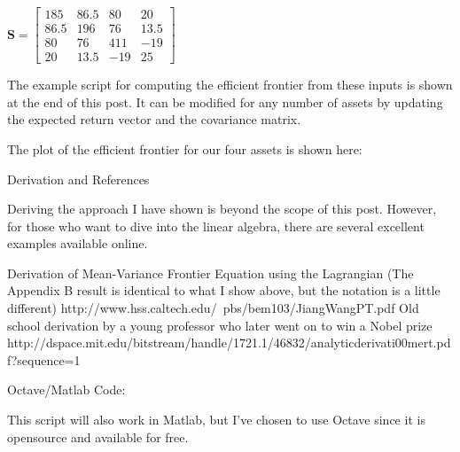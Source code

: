 \documentclass[12pt,a4paper]{article}
\begin{document}
$\mathbf{S}=\begin{bmatrix} 185& 86.5& 80& 20\\ 86.5& 196& 76& 13.5\\ 80& 76& 411& -19\\ 20& 13.5& -19& 25 \end{bmatrix}$

The example script for computing the efficient frontier from these inputs is shown at the end of this post.  It can be modified for any number of assets by updating the expected return vector and the covariance matrix.

The plot of the efficient frontier for our four assets is shown here:


Derivation and References

Deriving the approach I have shown is beyond the scope of this post.  However, for those who want to dive into the linear algebra, there are several excellent examples available online.

Derivation of Mean-Variance Frontier Equation using the Lagrangian (The Appendix B result is identical to what I show above, but the notation is a little different)
http://www.hss.caltech.edu/~pbs/bem103/JiangWangPT.pdf
Old school derivation by a young professor who later went on to win a Nobel prize
http://dspace.mit.edu/bitstream/handle/1721.1/46832/analyticderivati00mert.pdf?sequence=1

Octave/Matlab Code:

This script will also work in Matlab, but I’ve chosen to use Octave since it is opensource and available for free.
\end{document}
